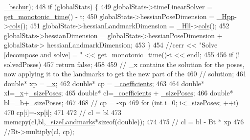 \begin{DoxyCode}
      \hyperlink{classg2o_1_1BlockSolver_aafddeb1d0a4218fc9c3c77169e20f81a}{\_bschur});
448   \textcolor{keywordflow}{if} (globalStats) \{
449     globalStats->timeLinearSolver = \hyperlink{namespaceg2o_aa64237935c7d8411b4369234a5f661ea}{get\_monotonic\_time}() - t;
450     globalStats->hessianPoseDimension = \hyperlink{classg2o_1_1BlockSolver_ac222d4342825ed8632a87b4f5be94618}{\_Hpp}->\hyperlink{classg2o_1_1SparseBlockMatrix_ab854ca59f370d93229852e32a7b49d3e}{cols}();
451     globalStats->hessianLandmarkDimension = \hyperlink{classg2o_1_1BlockSolver_a88d4c24df24a8fb72be1a4e4cff03d71}{\_Hll}->\hyperlink{classg2o_1_1SparseBlockMatrix_ab854ca59f370d93229852e32a7b49d3e}{cols}();
452     globalStats->hessianDimension = globalStats->hessianPoseDimension + globalStats->
      hessianLandmarkDimension;
453   \}
454   \textcolor{comment}{//cerr << "Solve [decompose and solve] = " <<  get\_monotonic\_time()-t << endl;}
455 
456   \textcolor{keywordflow}{if} (! solvedPoses)
457     \textcolor{keywordflow}{return} \textcolor{keyword}{false};
458 
459   \textcolor{comment}{// \_x contains the solution for the poses, now applying it to the landmarks to get the new part of the}
460   \textcolor{comment}{// solution;}
461   \textcolor{keywordtype}{double}* xp = \hyperlink{classg2o_1_1Solver_a94ee5e303a754f4ff338a7b032c214ae}{\_x};
462   \textcolor{keywordtype}{double}* cp = \hyperlink{classg2o_1_1BlockSolver_a416f480d4b27d7f8962ae7ae363f2e32}{\_coefficients};
463 
464   \textcolor{keywordtype}{double}* xl=\hyperlink{classg2o_1_1Solver_a94ee5e303a754f4ff338a7b032c214ae}{\_x}+\hyperlink{classg2o_1_1BlockSolver_a39ec000379885ce09cdd8c23ab6d4567}{\_sizePoses};
465   \textcolor{keywordtype}{double}* cl=\hyperlink{classg2o_1_1BlockSolver_a416f480d4b27d7f8962ae7ae363f2e32}{\_coefficients} + \hyperlink{classg2o_1_1BlockSolver_a39ec000379885ce09cdd8c23ab6d4567}{\_sizePoses};
466   \textcolor{keywordtype}{double}* bl=\hyperlink{classg2o_1_1Solver_a52c92c9bf5db0da3322da3a02dbeb245}{\_b}+\hyperlink{classg2o_1_1BlockSolver_a39ec000379885ce09cdd8c23ab6d4567}{\_sizePoses};
467 
468   \textcolor{comment}{// cp = -xp}
469   \textcolor{keywordflow}{for} (\textcolor{keywordtype}{int} i=0; i<\hyperlink{classg2o_1_1BlockSolver_a39ec000379885ce09cdd8c23ab6d4567}{\_sizePoses}; ++i)
470     cp[i]=-xp[i];
471 
472   \textcolor{comment}{// cl = bl}
473   memcpy(cl,bl,\hyperlink{classg2o_1_1BlockSolver_a13a49b5aac8ae3b12ed0c349fc0788e7}{\_sizeLandmarks}*\textcolor{keyword}{sizeof}(\textcolor{keywordtype}{double}));
474 
475   \textcolor{comment}{// cl = bl - Bt * xp}
476   \textcolor{comment}{//Bt->multiply(cl, cp);}

\end{DoxyCode}
